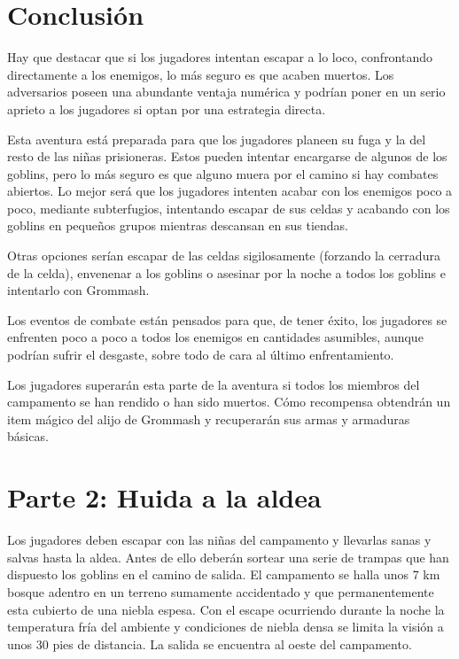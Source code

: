 \documentclass[10pt,twoside,twocolumn,openany]{dndbook}
\begin{document}
\section{Conclusión}

Hay que destacar que si los jugadores intentan escapar a lo loco, confrontando directamente a los 
enemigos, lo más seguro es que acaben muertos. Los adversarios poseen una abundante ventaja numérica y 
podrían poner en un serio aprieto a los jugadores si optan por una estrategia directa.

Esta aventura está preparada para que los jugadores planeen su fuga y la del resto de las niñas prisioneras. 
Estos pueden intentar encargarse de algunos de los goblins, pero lo más seguro es que alguno muera por 
el camino si hay combates abiertos. Lo mejor será que los jugadores intenten acabar con los enemigos 
poco a poco, mediante subterfugios, intentando escapar de sus celdas y acabando con los goblins en 
pequeños grupos mientras descansan en sus tiendas.

Otras opciones serían escapar de las celdas sigilosamente (forzando la cerradura de la celda), envenenar 
a los goblins o asesinar por la noche a todos los goblins e intentarlo con Grommash. 

Los eventos de combate están pensados para que, de tener éxito, los jugadores se enfrenten poco a poco 
a todos los enemigos en cantidades asumibles, aunque podrían sufrir el desgaste, sobre todo de cara al 
último enfrentamiento.

Los jugadores superarán esta parte de la aventura si todos los miembros del campamento se han rendido 
o han sido muertos. Cómo recompensa obtendrán un item mágico del alijo de Grommash y recuperarán sus 
armas y armaduras básicas.


\section*{Parte 2: Huida a la aldea}

Los jugadores deben escapar con las niñas del campamento y llevarlas sanas y salvas hasta la aldea. 
Antes de ello deberán sortear una serie de trampas que han dispuesto los goblins en el camino de salida. 
El campamento se halla unos 7 km bosque adentro en un terreno sumamente accidentado y que permanentemente 
esta cubierto de una niebla espesa. Con el escape ocurriendo durante la noche la temperatura fría del 
ambiente y condiciones de niebla densa se limita la visión a unos 30 pies de distancia. La salida 
se encuentra al oeste del campamento.
\end{document}
